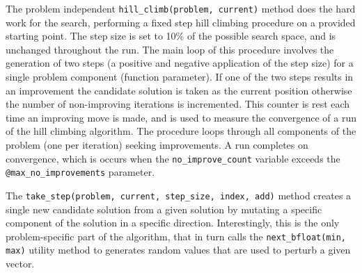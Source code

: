 The problem independent \texttt{hill\_climb(problem, current)} method does the hard work for the search, performing a fixed step hill climbing procedure on a provided starting point. The step size is set to 10\% of the possible search space, and is unchanged throughout the run. The main loop of this procedure involves the generation of two steps (a positive and negative application of the step size) for a single problem component (function parameter). If one of the two steps results in an improvement the candidate solution is taken as the current position otherwise the number of non-improving iterations is incremented. This counter is rest each time an improving move is made, and is used to measure the convergence of a run of the hill climbing algorithm. The procedure loops through all components of the problem (one per iteration) seeking improvements. A run completes on convergence, which is occurs when the \texttt{no\_improve\_count} variable exceeds the \texttt{@max\_no\_improvements} parameter.

The \texttt{take\_step(problem, current, step\_size, index, add)} method creates a single new candidate solution from a given solution by mutating a specific component of the solution in a specific direction. Interestingly, this is the only problem-specific part of the algorithm, that in turn calls the \texttt{next\_bfloat(min, max)} utility method to generates random values that are used to perturb a given vector.

